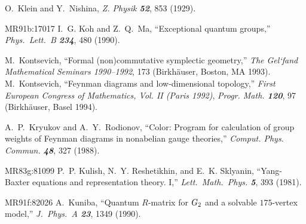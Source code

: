  O.~Klein and Y.~Nishina,
        {\em Z. Physik  \bf 52}, 853 (1929).

        {MR91b:17017}   I.~G. Koh and Z.~Q.~Ma,
        ``Exceptional quantum groups,''
        {\em Phys.~Lett.~B  \bf 234}, 480 (1990). %


 M.~Kontsevich,
``Formal (non)commutative symplectic geometry,''
{\em  The Gel`fand Mathematical Seminars 1990--1992}, 173
  (Birkh{\"a}user, Boston, MA 1993).
 M.~Kontsevich,
``Feynman diagrams and low-dimensional topology,''
{\em  First European Congress of Mathematics, Vol. II (Paris 1992)},
 {\em Progr. Math. \bf 120}, 97
(Birkh{\"a}user, Basel 1994). %
%


A.~P.~Kryukov and A.~Y.~Rodionov,
``Color: Program for calculation of group weights of Feynman
diagrams in nonabelian gauge theories,''
{\em Comput.  Phys.  Commun.    \bf 48}, 327 (1988).

        {MR83g:81099}
P.~P. Kulish, N.~Y. Reshetikhin, and E.~K. Sklyanin, ``Yang-Baxter
  equations and representation theory. I,''
{\em Lett.~Math.~Phys. \bf 5}, 393 (1981). %

        {MR91f:82026} A.~Kuniba,
``Quantum $R$-matrix for $G\sb 2$ and a solvable $175$-vertex model,''
{\em J.~Phys.~A  \bf 23}, 1349 (1990). %




